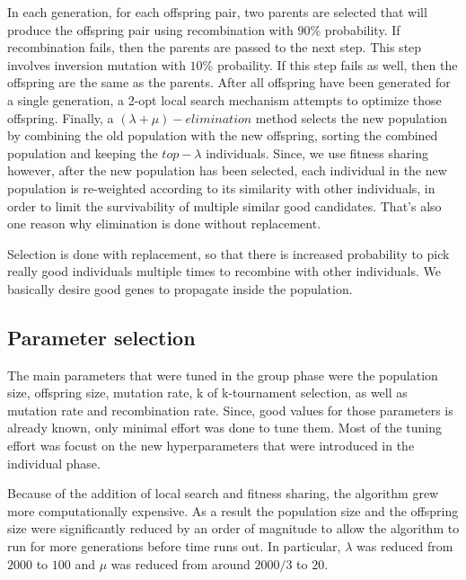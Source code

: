 \documentclass[a4paper,10pt]{article}
\newcommand{\ReplaceMe}[1]{{\color{blue}#1}}
\begin{document}
In each generation, for each offspring pair, two parents are selected that will produce the offspring pair using recombination with $90\%$ probability. If recombination fails, then the parents are passed to the next step. This step involves inversion mutation with $10\%$ probaility. If this step fails as well, then the offspring are the same as the parents. After all offspring have been generated for a single generation, a 2-opt local search mechanism attempts to optimize those offspring. Finally, a $(\lambda+\mu)-elimination$ method selects the new population by combining the old population with the new offspring, sorting the combined population and keeping the $top-\lambda$ individuals. Since, we use fitness sharing however, after the new population has been selected, each individual in the new population is re-weighted according to its similarity with other individuals, in order to limit the survivability of multiple similar good candidates. That's also one reason why elimination is done without replacement.

Selection is done with replacement, so that there is increased probability to pick really good individuals multiple times to recombine with other individuals. We basically desire good genes to propagate inside the population.

\subsection{Parameter selection}


The main parameters that were tuned in the group phase were the population size, offspring size, mutation rate, k of k-tournament selection, as well as mutation rate and recombination rate. Since, good values for those parameters is already known, only minimal effort was done to tune them. Most of the tuning effort was focust on the new hyperparameters that were introduced in the individual phase.

Because of the addition of local search and fitness sharing, the algorithm grew more computationally expensive. As a result the population size and the offspring size were significantly reduced by an order of magnitude to allow the algorithm to run for more generations before time runs out. In particular, $\lambda$ was reduced from $2000$ to $100$ and $\mu$ was reduced from around $2000/3$ to $20$.
\end{document}
